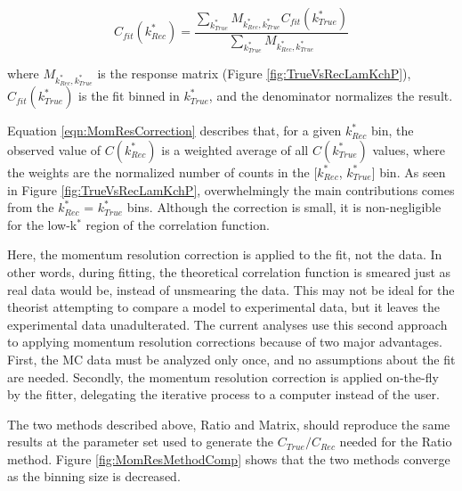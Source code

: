 \documentclass[../AnalysisNoteJBuxton.tex]{subfiles}
\begin{document}
\begin{equation}
  C_{fit}(k^{*}_{Rec}) = \dfrac{\sum\limits_{k^{*}_{True}}M_{k^{*}_{Rec},k^{*}_{True}}C_{fit}(k^{*}_{True})}{\sum\limits_{k^{*}_{True}}M_{k^{*}_{Rec},k^{*}_{True}}}
\label{eqn:MomResCorrection}
\end{equation}

where $M_{k^{*}_{Rec},k^{*}_{True}}$ is the response matrix (Figure \ref{fig:TrueVsRecLamKchP}), $C_{fit}(k^{*}_{True})$ is the fit binned in $k^{*}_{True}$, and the denominator normalizes the result.

Equation \ref{eqn:MomResCorrection} describes that, for a given $k^{*}_{Rec}$ bin, the observed value of $C(k^{*}_{Rec})$ is a weighted average of all $C(k^{*}_{True})$ values, where the weights are the normalized number of counts in the [$k^{*}_{Rec}$, $k^{*}_{True}$] bin.
As seen in Figure \ref{fig:TrueVsRecLamKchP}, overwhelmingly the main contributions comes from the $k^{*}_{Rec}$ = $k^{*}_{True}$ bins.
Although the correction is small, it is non-negligible for the low-k$^{*}$ region of the correlation function.

Here, the momentum resolution correction is applied to the fit, not the data.
In other words, during fitting, the theoretical correlation function is smeared just as real data would be, instead of unsmearing the data.
This may not be ideal for the theorist attempting to compare a model to experimental data, but it leaves the experimental data unadulterated.
The current analyses use this second approach to applying momentum resolution corrections because of two major advantages.  First, the MC data must be analyzed only once, and no assumptions about the fit are needed.  Secondly, the momentum resolution correction is applied on-the-fly by the fitter, delegating the iterative process to a computer instead of the user.

The two methods described above, Ratio and Matrix, should reproduce the same results at the parameter set used to generate the $C_{True}/C_{Rec}$ needed for the Ratio method.  Figure \ref{fig:MomResMethodComp} shows that the two methods converge as the binning size is decreased.
\end{document}
